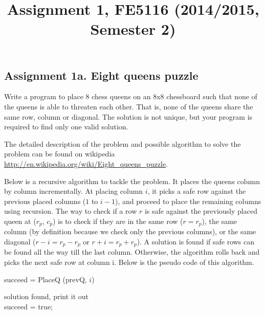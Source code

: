 \documentclass[12pt,a4paper,hidelinks,fleqn]{article}            %
\title{\vspace{-5ex}Assignment 1, FE5116 (2014/2015, Semester 2)\vspace{-7ex}}
\date{}
\begin{document}
\maketitle
\subsection*{Assignment 1a. Eight queens puzzle}
Write a program to place 8 chess queens on an 8x8 chessboard 
such that none of the queens is able to threaten each other.
That is, none of the queens share the same row, column or diagonal.
The solution is not unique, but your program is required to find only one valid solution.

The detailed description of the problem and possible algorithm to solve the problem can be found on wikipedia \url{http://en.wikipedia.org/wiki/Eight_queens_puzzle}.

Below is a recursive algorithm to tackle the problem.
It places the queens column by column incrementally. 
At placing column $i$, it picks a safe row against the previous placed columns ($1$ to $i-1$), 
and proceed to place the remaining columns using recursion. 
The way to check if a row $r$ is safe against the previously placed queen at ($r_p$, $c_p$) is to check if they are in the same row ($r = r_p$), the same column (by definition because we check only the previous columns), or the same diagonal ($r - i = r_p - r_p$ or $r + i = r_p + r_p$).
A solution is found if safe rows can be found all the way till the last column.
Otherwise, the algorithm rolls back and picks the next safe row at column i.
Below is the pseudo code of this algorithm.

\begin{algorithm}
	\caption{succeed = PlaceQ (prevQ, $i$)}
	 {
		solution found, print it out \\
		succeed = true;
	}
\end{algorithm}
\end{document}
